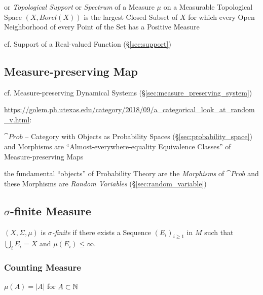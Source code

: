 or \emph{Topological Support} or \emph{Spectrum} of a Measure $\mu$ on a
Measurable Topological Space $(\xspace{X}, Borel(\xspace{X}))$ is the largest
Closed Subset of $\xspace{X}$ for which every Open Neighborhood of every Point
of the Set has a Positive Measure

cf. Support of a Real-valued Function (\S\ref{sec:support})



\subsection{Measure-preserving Map}\label{sec:measure_preserving_map}

cf. Measure-preserving Dynamical Systems (\S\ref{sec:measure_preserving_system})

\url{https://golem.ph.utexas.edu/category/2018/09/a_categorical_look_at_random_v.html}:

$\cat{Prob}$ -- Category with Objects as Probability Spaces
(\S\ref{sec:probability_space}) and Morphisms are ``Almost-everywhere-equality
Equivalence Classes'' of Measure-preserving Maps

the fundamental ``objects'' of Probability Theory are the \emph{Morphisms} of
$\cat{Prob}$ and these Morphisms are \emph{Random Variables}
(\S\ref{sec:random_variable})



\subsection{$\sigma$-finite Measure}\label{sec:sigma_finite}

$(X,\Sigma,\mu)$ is \emph{$\sigma$-finite} if there exists a Sequence
$(E_i)_{i \geq 1}$ in $M$ such that $\bigcup_{i} E_i = X$ and
$\mu(E_i) \leq \infty$.



\subsubsection{Counting Measure}\label{sec:counting_measure}

$\mu(A) = |A|$ for $A \subset \mathbb{N}$



